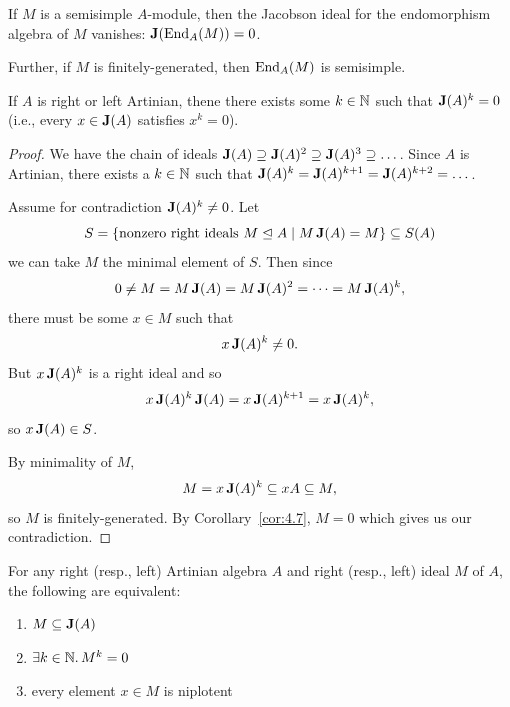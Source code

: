 \begin{example}[Homework]\label{ex:4.12}
If $M$ is a semisimple $A$-module, then the Jacobson ideal for the
endomorphism algebra of $M$ vanishes: $\operatorname{\textup{\textbf{J}}}(\operatorname{End}_{A}(M))=0$.

Further, if $M$ is finitely-generated, then $\operatorname{End}_{A}(M)$ is semisimple.
\end{example}

\begin{proposition}\label{prop:4.13}
If $A$ is right or left Artinian, thene there exists some $k\in\mathbb{N}$
such that $\operatorname{\textup{\textbf{J}}}(A)^{k}=0$ (i.e., every $x\in\operatorname{\textup{\textbf{J}}}(A)$
satisfies $x^{k}=0$).
\end{proposition}

\begin{proof}
We have the chain of ideals $\operatorname{\textup{\textbf{J}}}(A)\supseteq\operatorname{\textup{\textbf{J}}}(A)^{2}\supseteq\operatorname{\textup{\textbf{J}}}(A)^{3}\supseteq\dots$.
Since $A$ is Artinian, there exists a $k\in\mathbb{N}$ such that
$\operatorname{\textup{\textbf{J}}}(A)^{k}=\operatorname{\textup{\textbf{J}}}(A)^{k+1}=\operatorname{\textup{\textbf{J}}}(A)^{k+2}=\dots$.

Assume for contradiction $\operatorname{\textup{\textbf{J}}}(A)^{k}\neq0$. Let
\begin{equation}
S=\{\mbox{nonzero right ideals }M\mathrel{\trianglelefteq} A\mid M\operatorname{\textup{\textbf{J}}}(A)=M\}\subseteq S(A)
\end{equation}
we can take $M$ the minimal element of $S$. Then since
\begin{equation}
0\neq M=M\operatorname{\textup{\textbf{J}}}(A)=M\operatorname{\textup{\textbf{J}}}(A)^{2}=\dots=M\operatorname{\textup{\textbf{J}}}(A)^{k},
\end{equation}
there must be some $x\in M$ such that
\begin{equation}
x\operatorname{\textup{\textbf{J}}}(A)^{k}\neq0.
\end{equation}
But $x\operatorname{\textup{\textbf{J}}}(A)^{k}$ is a right ideal and so
\begin{equation}
x\operatorname{\textup{\textbf{J}}}(A)^{k}\operatorname{\textup{\textbf{J}}}(A)=x\operatorname{\textup{\textbf{J}}}(A)^{k+1}=x\operatorname{\textup{\textbf{J}}}(A)^{k},
\end{equation}
so $x\operatorname{\textup{\textbf{J}}}(A)\in S$.

By minimality of $M$,
\begin{equation}
M=x\operatorname{\textup{\textbf{J}}}(A)^{k}\subseteq xA\subseteq M,
\end{equation}
so $M$ is finitely-generated. By Corollary~\ref{cor:4.7}, $M=0$ which
gives us our contradiction.
\end{proof}

\begin{corollary}\label{cor:4.14}
For any right (resp., left) Artinian algebra $A$ and right (resp.,
left) ideal $M$ of $A$, the following are equivalent:
\begin{enumerate}
\item $M\subseteq\operatorname{\textup{\textbf{J}}}(A)$
\item $\exists k\in\mathbb{N}\ldotp M^{k}=0$
\item every element $x\in M$ is niplotent
\end{enumerate}
\end{corollary}


